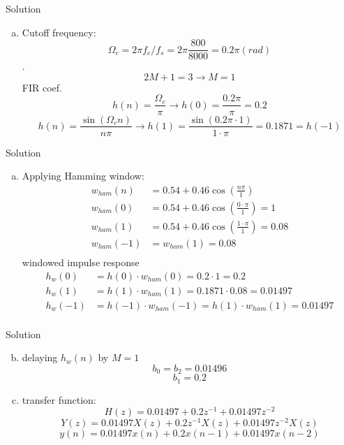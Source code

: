 \documentclass[pdflatex,compress,mathserif]{beamer}
\begin{document}
\begin{frame}{Solution}
    \begin{enumerate}[a.]
        \item Cutoff frequency: $$\Omega_c = 2\pi f_c /f_s = 2 \pi \frac{800}{8000} = 0.2 \pi (rad)$$. $$2M+1 = 3 \rightarrow M = 1$$ FIR coef. $$h(n) = \frac{\Omega_c}{\pi} \rightarrow h(0) = \frac{0.2 \pi}{\pi} = 0.2$$ $$h(n) = \frac{\sin(\Omega_c n)}{n \pi} \rightarrow h(1) = \frac{\sin(0.2 \pi \cdot 1)}{1 \cdot \pi}= 0.1871 = h(-1)$$
    \end{enumerate}
\end{frame}

\begin{frame}{Solution}
    \begin{enumerate}[a.]
        \item[] Applying Hamming window:
        \begin{align*}
            w_{ham}(n) &= 0.54 + 0.46 \cos(\frac{n \pi}{1}) \\
            w_{ham}(0) &= 0.54 + 0.46 \cos(\frac{0 \cdot \pi}{1}) = 1 \\
            w_{ham}(1) &= 0.54 + 0.46 \cos(\frac{1 \cdot \pi}{1}) = 0.08 \\
            w_{ham}(-1) &= w_{ham}(1) = 0.08 \\
        \end{align*}
        windowed impulse response
        \begin{align*}
            h_w(0) &= h(0) \cdot w_{ham}(0) = 0.2 \cdot 1 = 0.2 \\
            h_w(1) &= h(1) \cdot w_{ham}(1) = 0.1871 \cdot 0.08 = 0.01497 \\
            h_w(-1) &= h(-1) \cdot w_{ham}(-1) = h(1) \cdot w_{ham}(1) = 0.01497 \\
        \end{align*}
    \end{enumerate}
\end{frame}

\begin{frame}{Solution}
    \begin{enumerate}[a.]
        \setcounter{enumi}{1}
        \item[] delaying $h_w(n)$ by $M = 1$
        $$ b_0 = b_2 = 0.01496 $$
        $$ b_1= 0.2 $$
        \item transfer function:
        $$ H(z) = 0.01497 + 0.2 z^{-1} + 0.01497z^{-2}$$
        $$ Y(z) = 0.01497X(z) + 0.2 z^{-1} X(z) + 0.01497z^{-2} X(z)$$
        $$ y(n) = 0.01497x(n) + 0.2 x(n-1) + 0.01497 x(n-2)$$
    \end{enumerate}
\end{frame}
\end{document}
